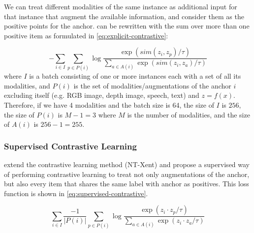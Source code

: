 \documentclass[10pt]{article} %
\begin{document}
We can treat different modalities of the same instance as additional input for that instance that augment the available information, and consider them as the positive points for the anchor.
 can be rewritten with the sum over more than one positive item as formulated in \cref{eq:explicit-contrastive}:


\begin{equation}\label{eq:explicit-contrastive}
    - \sum_{i \in I} \sum_{p \in P(i)} \log \frac{\exp (sim(z_i , z_{p})/ \tau) }{
    \sum_{a \in A(i)} \exp (sim(z_i, z_a) / \tau)}
\end{equation}
where $I$ is a batch consisting of one or more instances each with a set of all its modalities, and $P(i)$ is the set of modalities/augmentations of the anchor $i$ excluding itself (e.g. RGB image, depth image, speech, text) and $z = f(x)$. Therefore, if we have 4 modalities and the batch size is 64, the size of $I$ is $256$, the size of $P(i)$ is $M-1 = 3$ where $M$ is the number of modalities, and the size of $A(i)$ is $256 - 1 = 255$.


\subsubsection{Supervised Contrastive Learning}
\label{sub:baseline-supcon}

\citet{NEURIPS2020_supervised_contrastive} extend the contrastive learning method (NT-Xent) and propose a supervised way of performing contrastive learning to treat not only augmentations of the anchor, but also every item that shares the same label with anchor as positives. This loss function is shown in \cref{eq:supervised-contrastive}.

\begin{equation}\label{eq:supervised-contrastive}
    \sum_{i \in I} \frac{-1}{|P(i)|} \sum_{p \in P(i)} \log \frac{\exp (z_i \cdot z_p / \tau) }{\sum_{a \in A(i)} \exp (z_i \cdot z_a / \tau)}
\end{equation}

\end{document}
